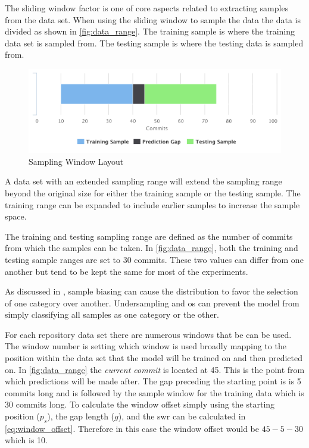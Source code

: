 
The sliding window factor is one of core aspects related to extracting samples from the data set. When using the sliding window to sample the data the data is divided as shown in \autoref{fig:data_range}. The training sample is where the training data set is sampled from. The testing sample is where the testing data is sampled from. 

\begin{figure}[!ht]
    \centering
        \includegraphics[width=1.0\textwidth]{images/exp_data_range}
    \caption{Sampling Window Layout}
    \label{fig:data_range}
\end{figure}


A data set with an extended sampling range will extend the sampling range beyond the original size for either the training sample or the testing sample. The training range can be expanded to include earlier samples to increase the sample space.

The training and testing sampling range are defined as the number of commits from which the samples can be taken. In \autoref{fig:data_range}, both the training and testing sample ranges are set to 30 commits. These two values can differ from one another but tend to be kept the same for most of the experiments.

As discussed in , sample biasing can cause the distribution to favor the selection of one category over another. Undersampling and \gls{os} can prevent the model from simply classifying all samples as one category or the other.

For each repository data set there are numerous windows that be can be used. The window number is setting which window is used broadly mapping to the position within the data set that the model will be trained on and then predicted on. In \autoref{fig:data_range} the \textit{current commit} is located at 45. This is the point from which predictions will be made after. The gap preceding the starting point is is 5 commits long and is followed by the sample window for the training data which is 30 commits long. To calculate the window offset simply using the starting position ($p_s$), the gap length ($g$), and the \gls{swr} can be calculated in \autoref{eq:window_offset}. Therefore in this case the window offset would be $45 - 5 - 30$ which is 10.

